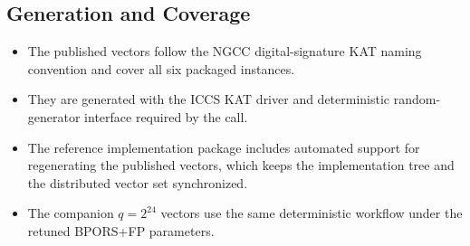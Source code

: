 \subsection{Generation and Coverage}

\begin{itemize}
    \item The published vectors follow the NGCC digital-signature KAT naming convention and cover all six packaged instances.
    \item They are generated with the ICCS KAT driver and deterministic random-generator interface required by the call.
    \item The reference implementation package includes automated support for regenerating the published vectors, which keeps the implementation tree and the distributed vector set synchronized.
    \item The companion $q=2^{24}$ vectors use the same deterministic workflow under the retuned BPORS+FP parameters.
\end{itemize}
